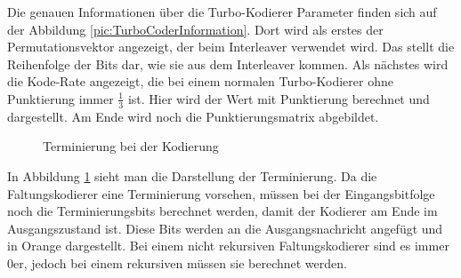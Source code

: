 Die genauen Informationen über die Turbo-Kodierer Parameter finden sich auf der Abbildung \ref{pic:TurboCoderInformation}. Dort wird als erstes der Permutationsvektor angezeigt, der beim Interleaver verwendet wird. Das stellt die Reihenfolge der Bits dar, wie sie aus dem Interleaver kommen. Als nächstes wird die Kode-Rate angezeigt, die bei einem normalen Turbo-Kodierer ohne Punktierung immer $\frac{1}{3}$ ist. Hier wird der Wert mit Punktierung berechnet und dargestellt. Am Ende wird noch die Punktierungsmatrix abgebildet.

\begin{figure}[!ht]
\centering
{}
\caption{Terminierung bei der Kodierung}
\label{pic:TerminationEncode}
\end{figure}  

In Abbildung \ref{pic:TerminationEncode} sieht man die Darstellung der Terminierung. Da die Faltungskodierer eine Terminierung vorsehen, müssen bei der Eingangsbitfolge noch die Terminierungsbits berechnet werden, damit der Kodierer am Ende im Ausgangszustand ist. Diese Bits werden an die Ausgangsnachricht angefügt und in Orange dargestellt. Bei einem nicht rekursiven Faltungskodierer sind es immer 0er, jedoch bei einem rekursiven müssen sie berechnet werden.

